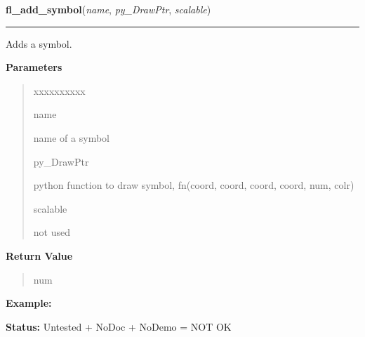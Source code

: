     \label{xformslib:library:fl_add_symbol}

    \vspace{0.5ex}

\hspace{.8\funcindent}\begin{boxedminipage}{\funcwidth}

    \raggedright \textbf{fl\_add\_symbol}(\textit{name}, \textit{py\_DrawPtr}, \textit{scalable})

    \vspace{-1.5ex}

    \rule{\textwidth}{0.5\fboxrule}
\setlength{\parskip}{2ex}
    Adds a symbol.

\setlength{\parskip}{1ex}
      \textbf{Parameters}
      \vspace{-1ex}

      \begin{quote}
        \begin{Ventry}{xxxxxxxxxx}

          \item[name]

          name of a symbol

          \item[py\_DrawPtr]

          python function to draw symbol, fn(coord, coord, coord, coord, 
          num, colr)

          \item[scalable]

          not used

        \end{Ventry}

      \end{quote}

      \textbf{Return Value}
    \vspace{-1ex}

      \begin{quote}
      num

      \end{quote}

\textbf{Example:} 

\textbf{Status:} Untested + NoDoc + NoDemo = NOT OK



    \end{boxedminipage}

